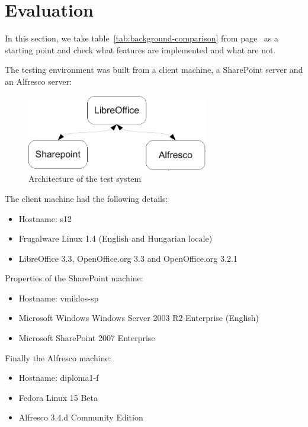 \section{Evaluation}

In this section, we take table~\ref{tab:background-comparison} from
page~\pageref{tab:background-comparison} as a starting point and check what
features are implemented and what are not.

The testing environment was built from a client machine, a SharePoint server
and an Alfresco server:

\begin{figure}[H]
\centering
\includegraphics[width=300px,keepaspectratio]{test-arch.pdf}
\caption{Architecture of the test system}
\end{figure}

The client machine had the following details:
\begin{itemize}
\item Hostname: s12
\item Frugalware Linux 1.4 (English and Hungarian locale)
\item LibreOffice 3.3, OpenOffice.org 3.3 and OpenOffice.org 3.2.1
\end{itemize}

Properties of the SharePoint machine:

\begin{itemize}
\item Hostname: vmiklos-sp
\item Microsoft Windows Windows Server 2003 R2 Enterprise (English)
\item Microsoft SharePoint 2007 Enterprise
\end{itemize}

Finally the Alfresco machine:

\begin{itemize}
\item Hostname: diploma1-f
\item Fedora Linux 15 Beta
\item Alfresco 3.4.d Community Edition
\end{itemize}

